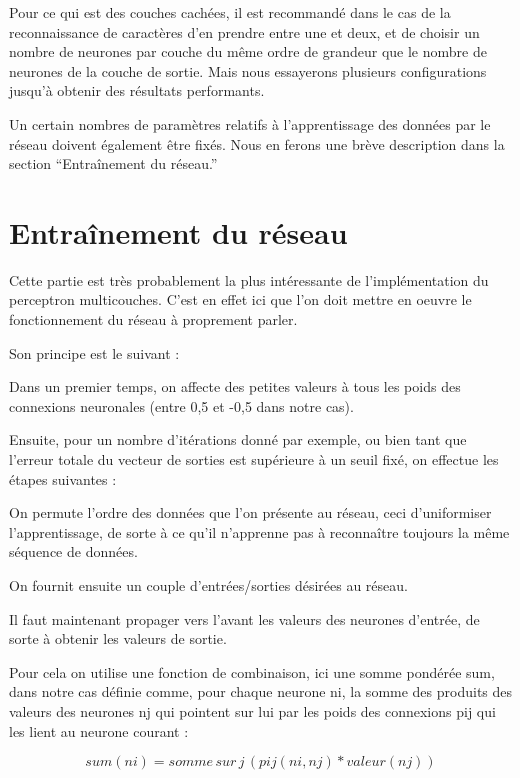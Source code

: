 Pour ce qui est des couches cach\'ees, il est recommand\'e dans le cas
de la reconnaissance de caract\`eres d'en prendre entre une et deux, et
de choisir un nombre de neurones par couche du m\^eme ordre de grandeur
que le nombre de neurones de la couche de sortie. Mais nous essayerons
plusieurs configurations jusqu'\`a obtenir des r\'esultats
performants.

Un certain nombres de param\`etres relatifs \`a l'apprentissage des
donn\'ees par le r\'eseau doivent \'egalement \^etre fix\'es. Nous en
ferons une br\`eve description dans la section ``Entra\^inement du r\'eseau.''


\section{Entra\^inement du r\'eseau} %
\label{subsec:entrainement_du_reseau}

Cette partie est tr\`es probablement la plus int\'eressante de
l'impl\'ementation du perceptron multicouches. C'est en effet ici que
l'on doit mettre en oeuvre le fonctionnement du r\'eseau \`a proprement
parler. 

Son principe est le suivant :

Dans un premier temps, on affecte des petites valeurs \`a tous les poids
des connexions neuronales (entre 0,5 et -0,5 dans notre cas).

Ensuite, pour un nombre d'it\'erations donn\'e par exemple, ou bien tant
que l'erreur totale du vecteur de sorties est supérieure à un seuil fixé, on effectue
les \'etapes suivantes :

On permute l'ordre des donn\'ees que l'on pr\'esente au r\'eseau, ceci
d'uniformiser l'apprentissage, de sorte \`a ce qu'il n'apprenne pas \`a reconna\^itre toujours la m\^eme
s\'equence de donn\'ees.

On fournit ensuite un couple d'entr\'ees/sorties d\'esir\'ees au
r\'eseau.

Il faut maintenant propager vers l'avant les valeurs des neurones
d'entr\'ee, de sorte \`a obtenir les valeurs de sortie.

Pour cela on utilise une fonction de combinaison, ici une somme
pond\'er\'ee sum, dans notre cas
d\'efinie comme, pour chaque neurone ni, la somme des produits des valeurs
des neurones nj qui pointent sur lui par les poids des connexions pij qui les
lient au neurone courant :

\[sum(ni) = somme\, sur\, j\, (pij(ni,nj)* valeur(nj))
\]%
\\

